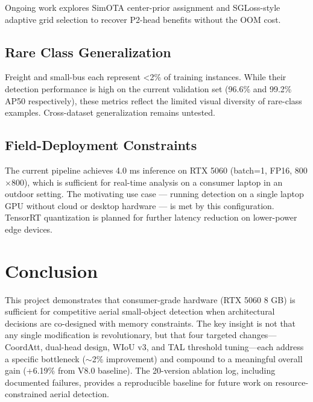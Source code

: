 \documentclass[11pt]{article}
\begin{document}
Ongoing work explores SimOTA center-prior assignment and SGLoss-style adaptive grid selection
\cite{li2022generalized} to recover P2-head benefits without the OOM cost.

\subsection{Rare Class Generalization}

Freight and small-bus each represent <2\% of training instances. While their detection
performance is high on the current validation set (96.6\% and 99.2\% AP50 respectively),
these metrics reflect the limited visual diversity of rare-class examples. Cross-dataset
generalization remains untested.

\subsection{Field-Deployment Constraints}

The current pipeline achieves 4.0 ms inference on RTX 5060 (batch=1, FP16, 800$\times$800),
which is sufficient for real-time analysis on a consumer laptop in an outdoor setting. The
motivating use case — running detection on a single laptop GPU without cloud or desktop
hardware — is met by this configuration. TensorRT quantization is planned for further
latency reduction on lower-power edge devices.

\section{Conclusion}

This project demonstrates that consumer-grade hardware (RTX 5060 8 GB) is sufficient for
competitive aerial small-object detection when architectural decisions are co-designed with
memory constraints. The key insight is not that any single modification is revolutionary, but
that four targeted changes—CoordAtt, dual-head design, WIoU v3, and TAL threshold tuning—each
address a specific bottleneck ($\sim$2\% improvement) and compound to a meaningful overall gain
(+6.19\% from V8.0 baseline). The 20-version ablation log, including documented failures,
provides a reproducible baseline for future work on resource-constrained aerial detection.

\end{document}
